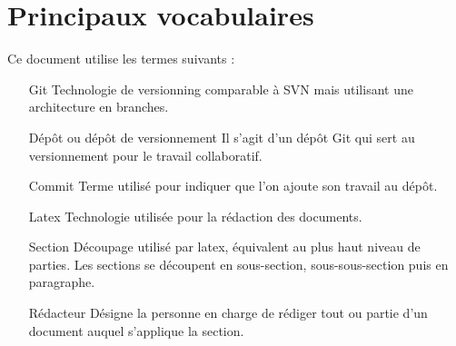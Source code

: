 \section{Principaux vocabulaires}

Ce document utilise les termes suivants :

\begin{itemize}
    \item[Git] Technologie de versionning comparable à SVN mais utilisant une
architecture en branches.
    \item[Dépôt ou dépôt de versionnement] Il s'agit d'un dépôt Git qui sert
au versionnement pour le travail collaboratif.
    \item[Commit] Terme utilisé pour indiquer que l'on ajoute son travail
au dépôt.
    \item[Latex] Technologie utilisée pour la rédaction des documents.
    \item[Section] Découpage utilisé par latex, équivalent au plus haut niveau
de parties. Les sections se découpent en sous-section, sous-sous-section puis
en paragraphe.
    \item[Rédacteur] Désigne la personne en charge de rédiger tout ou partie
d'un document auquel s'applique la section.
\end{itemize}

\pagebreak

